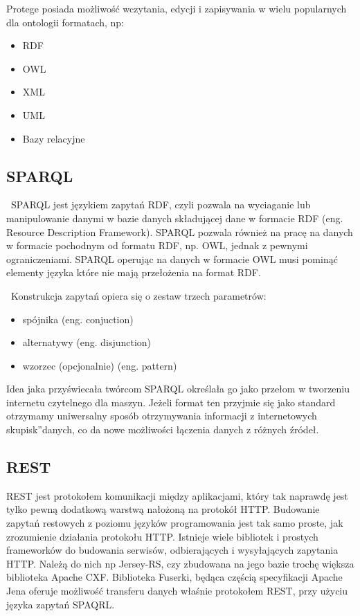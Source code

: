 Protege posiada możliwość wczytania, edycji i zapisywania w wielu popularnych dla ontologii formatach, np:
\begin{itemize}
\item RDF
\item OWL
\item XML
\item UML
\item Bazy relacyjne
\end{itemize}

\subsection{SPARQL}
\label{sec:sparql}

~SPARQL jest językiem zapytań RDF, czyli pozwala na wyciaganie lub manipulowanie danymi w bazie danych składującej dane w formacie RDF (eng. Resource Description Framework). SPARQL pozwala również na pracę na danych w formacie pochodnym od formatu RDF, np. OWL, jednak z pewnymi ograniczeniami. SPARQL operując na danych w formacie OWL musi pominąć elementy języka które nie mają przełożenia na format RDF.

~Konstrukcja zapytań opiera się o zestaw trzech parametrów:
\begin{itemize}
\item spójnika (eng. conjuction)
\item alternatywy (eng. disjunction)
\item wzorzec (opcjonalnie) (eng. pattern)
\end{itemize}

Idea jaka przyświecała twórcom SPARQL określała go jako przełom w tworzeniu internetu czytelnego dla maszyn. Jeżeli format ten przyjmie się jako standard otrzymamy uniwersalny sposób otrzymywania informacji z internetowych \quotedblbase skupisk\textquotedblright  danych, co da nowe możliwości łączenia danych z różnych źródeł.


\subsection{REST}
\label{sec:rest}

REST jest protokołem komunikacji między aplikacjami, który tak naprawdę jest tylko pewną dodatkową warstwą nałożoną na protokół HTTP. Budowanie zapytań restowych z poziomu języków programowania jest tak samo proste, jak zrozumienie działania protokołu HTTP. Istnieje wiele bibliotek i prostych frameworków do budowania serwisów, odbierających i wysyłających zapytania HTTP. Należą do nich np Jersey-RS, czy zbudowana na jego bazie trochę większa biblioteka Apache CXF. Biblioteka Fuserki, będąca częścią specyfikacji Apache Jena oferuje możliwość transferu danych właśnie protokołem REST, przy użyciu języka zapytań SPAQRL. 

